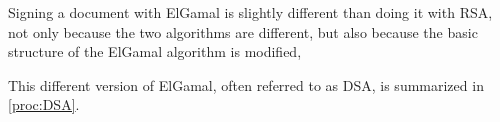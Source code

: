 \documentclass{subfiles}
\begin{document}
    Signing a document with ElGamal is slightly different than doing it with RSA,
        not only because the two algorithms are different,
        but also because the basic structure of the ElGamal algorithm is modified,
        
    This different version of ElGamal, often referred to as DSA,
        is summarized in \autoref{proc:DSA}.
        
\end{document}
